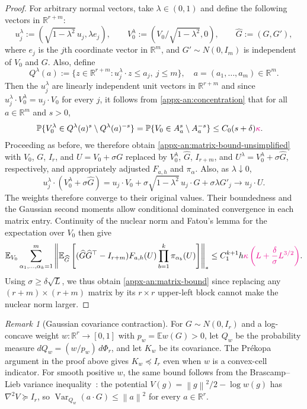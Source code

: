 \documentclass[11pt,letterpaper]{article}
\newcommand{\vSix}[1]{{\color{magenta}#1}}
\theoremstyle{remark}
\newtheorem{remark}{Remark}
\newcommand{\E}{\mathbb E}
\newcommand{\R}{\mathbb R}
\newcommand{\norm}[1]{\left\lVert#1\right\rVert}
\begin{document}
\begin{proof}
For arbitrary normal vectors, take \(\lambda\in(0,1)\) and define the following vectors in $\R^{r+m}$:
\[
 u_j^\lambda:=(\sqrt{1-\lambda^2}\,u_j,\lambda e_j),\qquad
 V_0^\lambda:=(V_0/\sqrt{1-\lambda^2},0),\qquad
 \widehat G:=(G,G'),
\]
where \(e_j\) is the \(j\)th coordinate vector in \(\R^m\), and
\(G'\sim N(0,I_m)\) is independent of $V_0$ and $G$. Also, define
\[
Q^\lambda(a):=\{z\in\mathbb R^{r+m}:u_j^\lambda\cdot z\le a_j,\ j\le m\},\quad a=(a_1,\dots,a_m)\in\R^m.
\]
Then the \(u_j^\lambda\) are linearly independent unit vectors in $\R^{r+m}$ and
since \(u_j^\lambda\cdot V_0^\lambda=u_j\cdot V_0\) for every \(j\), it follows from \eqref{appx-an:concentration} that for all \(a\in\mathbb R^m\) and \(s>0\),
\[
\begin{aligned}
\mathbb P\{V_0^\lambda\in Q^\lambda(a)^s\setminus Q^\lambda(a)^{-s}\}
&=\mathbb P\{V_0\in A_a^s\setminus A_a^{-s}\} \le C_0(s+\delta)\vSix{\kappa}.
\end{aligned}
\]
Proceeding as before, we therefore obtain \eqref{appx-an:matrix-bound-unsimplified} with $V_0$, $G$, $I_r$, and $U=V_0+\sigma G$ replaced by $V_0^{\lambda}$, $\widehat G$, $I_{r+m}$, and $U^{\lambda} = V_0^{\lambda} + \sigma \widehat G$, respectively, and appropriately adjusted $F_{a, h}$ and $\pi_{\alpha}$. Also, as \(\lambda\downarrow0\),
\[
 u_j^\lambda\cdot(V_0^\lambda+\sigma\widehat G)
 =u_j\cdot V_0+\sigma\sqrt{1-\lambda^2}\,u_j\cdot G
                  +\sigma\lambda G'_j
 \longrightarrow u_j\cdot U.
\]
The weights therefore converge to their original values. Their
boundedness and the Gaussian second moments allow conditional dominated
convergence in each matrix entry. Continuity of the nuclear norm and
Fatou's lemma for the expectation over $V_0$ then give
\[
 \E_{V_0}\sum_{\alpha_1,\ldots,\alpha_k=1}^m
 \left\|\E_{\widehat G}\left[(\widehat G\widehat G^\top-I_{r+m})F_{a, h}(U)
              \prod_{b=1}^k\pi_{\alpha_b}(U)\right]\right\|_*
 \le C_1^{k+1}h\vSix{\kappa\left(L+\frac\delta\sigma L^{3/2}\right)}.
\]
Using \(\sigma\ge\delta\sqrt L\), we thus obtain \eqref{appx-an:matrix-bound} since replacing any $(r+m)\times(r+m)$ matrix by its $r\times r$ upper-left block cannot make the nuclear norm larger.
\par\endgroup
\end{proof}

\begin{remark}[Gaussian covariance contraction]\label{appx-rem:covariance-contraction}
For \(G\sim N(0,I_r)\) and a log-concave weight \(w:\R^r\to[0,1]\) with
\(p_w=\E w(G)>0\), let \(Q_w\) be the probability measure
\(dQ_w=(w/p_w)\,d\Phi_r\), and let \(K_w\) be its covariance.
The Pr\'ekopa argument in the proof above gives \(K_w\preceq I_r\)
even when \(w\) is a convex-cell indicator. For smooth positive
\(w\), the same bound follows from the Brascamp--Lieb variance
inequality~\cite{BrascampLieb1976}: the potential
\(V(g)=\norm g^2/2-\log w(g)\) has \(\nabla^2V\succeq I_r\),
so \(\operatorname{Var}_{Q_w}(a\cdot G)\le\norm a^2\) for every
\(a\in\R^r\).
\end{remark}
\end{document}
